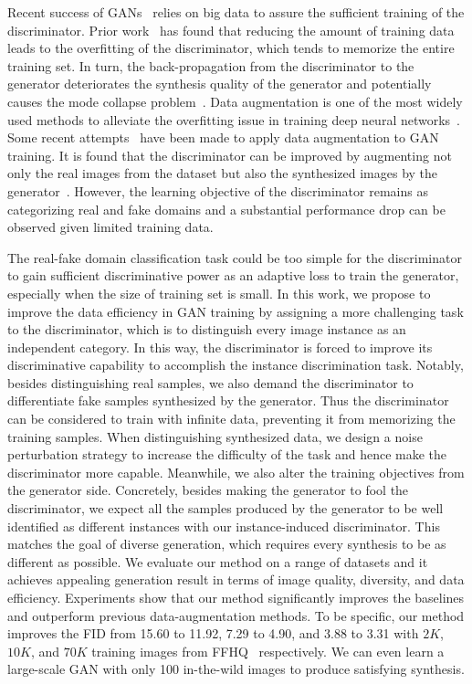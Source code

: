 \documentclass{article}
\begin{document}
Recent success of GANs~\cite{karras2017progressive, karras2019style, Karras2019stylegan2, brock2018large} relies on big data to assure the sufficient training of the discriminator.
Prior work~\cite{zhao2020differentiable, karras2020training} has found that reducing the amount of training data leads to the overfitting of the discriminator, which tends to memorize the entire training set.
In turn, the back-propagation from the discriminator to the generator deteriorates the synthesis quality of the generator and potentially causes the mode collapse problem~\cite{arjovsky2017towards, zhang2018pa}.
Data augmentation is one of the most widely used methods to alleviate the overfitting issue in training deep neural networks~\cite{zhang2017mixup,cubuk2020randaugment,cubuk2018autoaugment}.
Some recent attempts~\cite{karras2020training, tran2021data, zhao2020differentiable, zhao2020image, zhang2018pa} have been made to apply data augmentation to GAN training.
It is found that the discriminator can be improved by augmenting not only the real images from the dataset but also the synthesized images by the generator~\cite{zhao2020differentiable, karras2020training}.
However, the learning objective of the discriminator remains as categorizing real and fake domains and a substantial performance drop can be observed given limited training data.


The real-fake domain classification task could be too simple for the discriminator to gain sufficient discriminative power as an adaptive loss to train the generator, especially when the size of training set is small.
In this work, we propose to improve the data efficiency in GAN training by assigning a more challenging task to the discriminator, which is to distinguish every image instance as an independent category.
In this way, the discriminator is forced to improve its discriminative capability to accomplish the instance discrimination task.
Notably, besides distinguishing real samples, we also demand the discriminator to differentiate fake samples synthesized by the generator.
Thus the discriminator can be considered to train with infinite data, preventing it from memorizing the training samples.
When distinguishing synthesized data, we design a noise perturbation strategy to increase the difficulty of the task and hence make the discriminator more capable.
Meanwhile, we also alter the training objectives from the generator side.
Concretely, besides making the generator to fool the discriminator, we expect all the samples produced by the generator to be well identified as different instances with our instance-induced discriminator.
This matches the goal of diverse generation, which requires every synthesis to be as different as possible.
We evaluate our method on a range of datasets and it achieves appealing generation result in terms of image quality, diversity, and data efficiency.
Experiments show that our method significantly improves the baselines and outperform previous data-augmentation methods.
To be specific, our method improves the FID from 15.60 to 11.92, 7.29 to 4.90, and 3.88 to 3.31 with $2K$, $10K$, and $70K$ training images from FFHQ~\cite{karras2019style} respectively.
We can even learn a large-scale GAN with only 100 in-the-wild images to produce satisfying synthesis.
\end{document}
